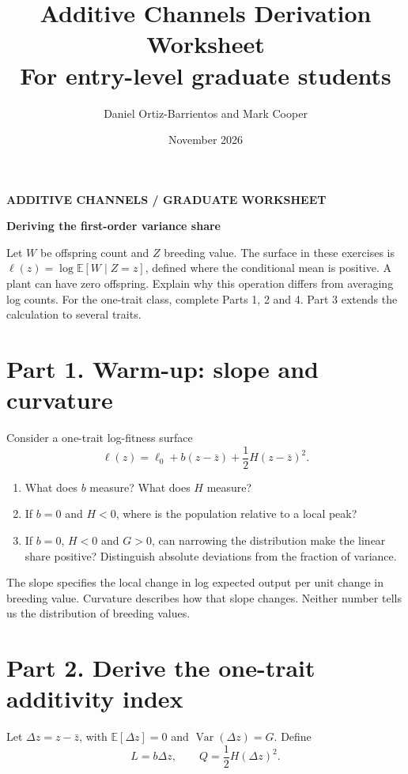 \documentclass[11pt]{article}
\title{Additive Channels Derivation Worksheet\\\large For entry-level graduate students}
\author{Daniel Ortiz-Barrientos and Mark Cooper}
\date{November 2026}
\newcommand{\E}{\mathbb E}
\newcommand{\Var}{\operatorname{Var}}
\begin{document}
{\small\color{forest}\bfseries ADDITIVE CHANNELS / GRADUATE WORKSHEET}\par{\LARGE\bfseries Deriving the first-order variance share}\par

\begin{taskbox}
Let $W$ be offspring count and $Z$ breeding value. The surface in these exercises is $\ell(z)=\log\E[W\mid Z=z]$, defined where the conditional mean is positive. A plant can have zero offspring. Explain why this operation differs from averaging log counts. For the one-trait class, complete Parts 1, 2 and 4. Part 3 extends the calculation to several traits.
\end{taskbox}

\section*{Part 1. Warm-up: slope and curvature}

Consider a one-trait log-fitness surface
\begin{equation}
\ell(z)=\ell_0+b(z-\bar z)+\frac12H(z-\bar z)^2.
\end{equation}

\begin{enumerate}
\item What does \(b\) measure? What does \(H\) measure?
\item If \(b=0\) and \(H<0\), where is the population relative to a local peak?
\item If $b=0$, $H<0$ and $G>0$, can narrowing the distribution make the linear share positive? Distinguish absolute deviations from the fraction of variance.
\end{enumerate}

\begin{biologybox}
The slope specifies the local change in log expected output per unit change in breeding value. Curvature describes how that slope changes. Neither number tells us the distribution of breeding values.
\end{biologybox}

\section*{Part 2. Derive the one-trait additivity index}

Let \(\Delta z=z-\bar z\), with \(\mathbb E[\Delta z]=0\) and \(\Var(\Delta z)=G\). Define
\begin{equation}
L=b\Delta z,
\qquad
Q=\frac12H(\Delta z)^2.
\end{equation}
\end{document}
